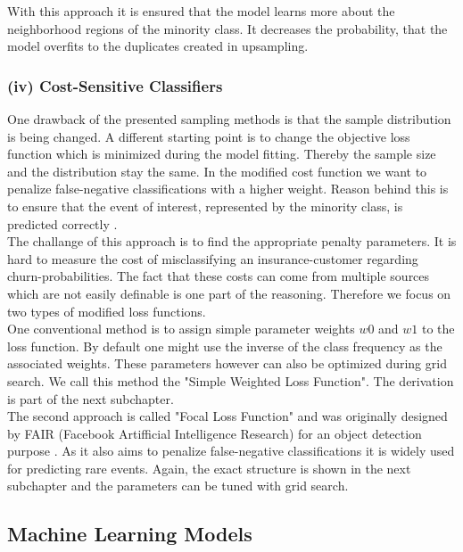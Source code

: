 \documentclass[12pt,titlepage]{article}
\begin{document}
With this approach it is ensured that the model learns more about the neighborhood regions of the minority class. It decreases the probability, that the model overfits to the duplicates created in upsampling. \\

\subsubsection*{(iv) Cost-Sensitive Classifiers} \label{Cost-Sensitive Classifiers}
One drawback of the presented sampling methods is that the sample distribution is being changed. A different starting point is to change the objective loss function which is minimized during the model fitting. Thereby the sample size and the distribution stay the same. In the modified cost function we want to penalize false-negative
classifications with a higher weight. Reason behind this is to ensure that the event of interest, represented by the minority class, is predicted correctly \cite{cost_sensitive}. \\
The challange of this approach is to find the appropriate penalty parameters. It is hard to measure the cost of misclassifying an insurance-customer regarding churn-probabilities. The fact that these costs can come from multiple sources which are not easily definable is one part of the reasoning. Therefore we focus on two types of modified loss functions.\\
One conventional method is to assign simple parameter weights $w0$ and $w1$ to the loss function. By default one might use the inverse of the class frequency as the associated weights. These parameters however can also be optimized during grid search. We call this method the "Simple Weighted Loss Function". The derivation is part of the next subchapter.\\
The second approach is called "Focal Loss Function" and was originally designed by FAIR (Facebook Artifficial Intelligence Research) for an object detection purpose \cite{focal}. As it also aims to penalize false-negative classifications it is widely used for predicting rare events. Again, the exact structure is shown in the next subchapter and the parameters can be tuned with grid search.\\


\subsection{Machine Learning Models} \par
\end{document}
